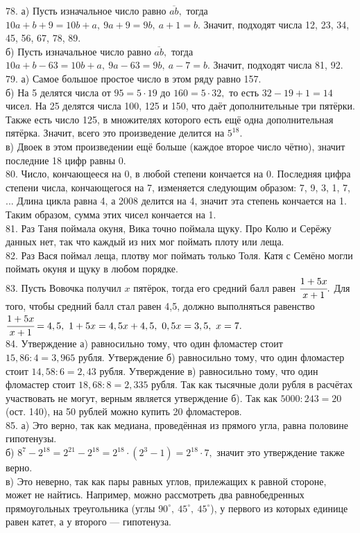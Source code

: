 78. а) Пусть изначальное число равно $\overline{ab},$ тогда $10a+b+9=10b+a,\ 9a+9=9b,\ a+1=b.$ Значит, подходят числа 12, 23, 34, 45, 56, 67, 78, 89.\\
б) Пусть изначальное число равно $\overline{ab},$ тогда $10a+b-63=10b+a,\ 9a-63=9b,\ a-7=b.$ Значит, подходят числа 81, 92.\\
79. а) Самое большое простое число в этом ряду равно 157.\\
б) На 5 делятся числа от $95=5\cdot19$ до $160=5\cdot32,$ то есть $32-19+1=14$ чисел. На 25 делятся числа 100, 125 и 150, что даёт дополнительные три пятёрки. Также есть число 125, в множителях которого есть ещё одна дополнительная пятёрка. Значит, всего это произведение делится на $5^{18}.$\\
в) Двоек в этом произведении ещё больше (каждое второе число чётно), значит последние 18 цифр равны 0.\\
80. Число, кончающееся на 0, в любой степени кончается на 0. Последняя цифра степени числа, кончающегося на 7, изменяется следующим образом: 7, 9, 3, 1, 7, ...
Длина цикла равна 4, а 2008 делится на 4, значит эта степень кончается на 1. Таким образом, сумма этих чисел кончается на 1.\\
81. Раз Таня поймала окуня, Вика точно поймала щуку. Про Колю и Серёжу данных нет, так что каждый из них мог поймать плоту или леща.\\
82. Раз Вася поймал леща, плотву мог поймать только Толя. Катя с Семёно могли поймать окуня и щуку в любом порядке.\\
83. Пусть Вовочка получил $x$ пятёрок, тогда его средний балл равен $\cfrac{1+5x}{x+1}.$ Для того, чтобы средний балл стал равен 4,5, должно выполняться равенство
$\cfrac{1+5x}{x+1}=4,5,\ 1+5x=4,5x+4,5,\ 0,5x=3,5,\ x=7.$\\
84. Утверждение а) равносильно тому, что один фломастер стоит $15,86:4=3,965$ рубля. Утверждение б) равносильно тому, что один фломастер стоит $14,58:6=2,43$ рубля. Утверждение в) равносильно тому, что один фломастер стоит $18,68:8=2,335$ рубля. Так как тысячные доли рубля в расчётах участвовать не могут, верным является утверждение б).  Так как $5000:243=20$ (ост. 140), на 50 рублей можно купить 20 фломастеров.\\
85. а) Это верно, так как медиана, проведённая из прямого угла, равна половине гипотенузы.\\
б) $8^7-2^{18}=2^{21}-2^{18}=2^{18}\cdot(2^3-1)=2^{18}\cdot7,$ значит это утверждение также верно.\\
в) Это неверно, так как пары равных углов, прилежащих к равной стороне, может не найтись. Например, можно рассмотреть два равнобедренных прямоугольных треугольника (углы $90^\circ,\ 45^\circ,\ 45^\circ$), у первого из которых единице равен катет, а у второго --- гипотенуза.\\

